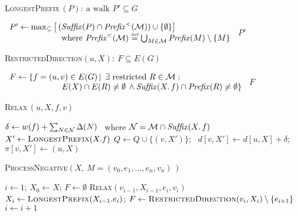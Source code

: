 \documentclass[envcountsect,envcountsame]{llncs}
\begin{document}
\vspace{-4ex}
\small{
\noindent
\textsc{LongestPrefix}$\,(P) :\> \textrm{a walk } P' \subseteq G$
\begin{algorithmic}[1]
    \item[]
    \vskip 0pt
    \smallskip
    \STATE $\begin{array}{l} P' \leftarrow \max_{\subseteq}       
      \big[\,(\mathit{Suf\!fix}(P) \cap \mathit{Prefix}^<({\cal{M}})) 
      \cup \{\emptyset\}\big] \\ ~~~~~~~~~~~~~~~~~~~
      \mbox{where }\mathit{Prefix}^{<}({\cal M}) 
      \stackrel{\textrm{\tiny{def}}}{=} \bigcup\nolimits_{M\in 
        \cal M}\mathit{Prefix}(M)\setminus\{M\} \end{array}$
    \RETURN $P'$
    \smallskip
\end{algorithmic}

\noindent
\textsc{RestrictedDirection}$(u,X) :\> F\subseteq E(G)$
\begin{algorithmic}[1]    
    \item[]
    \vskip 0pt
    \STATE $\begin{array}{l}F \leftarrow \{ f = (u,v) \in E(G) \, | \, 
        ~\exists \textrm{ restricted } R \in {\cal{M}}: \\ ~~~~~~~~~~~~~~~~~~~
        E(X)\cap E(R)\neq \emptyset \, \land 
        \mathit{Suf\!fix}(X.\, f) \cap \mathit{Prefix}(R)\neq \emptyset\}
        \end{array}$
    \RETURN $F$
\bigskip
\end{algorithmic}

\noindent
\textsc{Relax}$\,(u,X,f,v)$
\begin{algorithmic}[1]
    \vspace*{-\baselineskip}    
    \item[]
    \vskip 0pt
    \STATE $\delta \leftarrow w(f) + \sum_{N \in {\cal{N}}} \Delta(N)$ ~where 
    ${\cal{N}} = {\cal{M}} \cap \mathit{Suf\!fix}(X .\,f)$      
    \STATE $X' \leftarrow \textsc{LongestPrefix}(X . f)$
    \STATE $Q \leftarrow Q \cup \{(v,X')\}$;~
    $d[v,X'] \leftarrow d[u,X] + \delta$;~
    $\pi[v,X'] \leftarrow (u,X)$
    \ENDIF
    \smallskip
\end{algorithmic}

\noindent
\textsc{ProcessNegative}$(X,\, M = (v_0,e_1,\ldots,e_n,v_n)\,)$
\begin{algorithmic}[1]    
  \STATE $i \leftarrow 1; \, X_0 \leftarrow X; \, F \leftarrow \emptyset$ 
      \STATE \textsc{Relax}$(v_{i-1},X_{i-1},e_i,v_i)$
      \STATE $X_{i}\leftarrow \textsc{LongestPrefix}(X_{i-1} . e_i)$;
      $F \leftarrow \textsc{RestrictedDirection}(v_i,X_i)
		\setminus\{e_{i+1}\}$
      \STATE $i \leftarrow i + 1$
  \ENDWHILE
\end{algorithmic}
}
\end{document}
